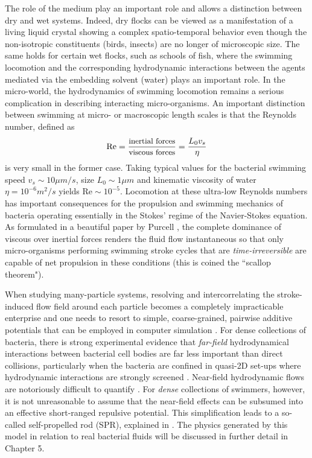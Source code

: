 \documentclass[amssymb]{revtex4}
\begin{document}
  
The role of the medium play an important role and allows a distinction between dry and wet systems.   Indeed, dry flocks can be viewed as a manifestation of a living liquid crystal showing a complex spatio-temporal behavior \cite{1995tonertu_prl} even though the non-isotropic constituents  (birds, insects) are no longer of microscopic size. The same holds for certain wet flocks, such as schools of fish, where the swimming locomotion and the corresponding hydrodynamic interactions between the agents mediated via the embedding solvent (water) plays an important role. In the micro-world, the hydrodynamics of swimming locomotion remains a serious complication in describing interacting micro-organisms. An important distinction between swimming at micro- or macroscopic length scales is that the Reynolds number, defined as 
\begin{equation}
\text {Re} =  \frac{\mbox{{\small inertial forces}}}{\mbox{{\small viscous forces}}} = \frac{L_{0} v_{s}}{\eta}
\end{equation}
is very small in the former case. Taking typical values for the bacterial swimming speed $v_{s} \sim 10 \mu m /s$,  size $L_{0} \sim 1 \mu m $ and kinematic viscosity of water $\eta = 10^{-6} m^{2}/s$ yields $\text{Re} \sim 10^{-5}$.  Locomotion at these ultra-low Reynolds numbers has important consequences for the propulsion and swimming mechanics of bacteria operating essentially in the Stokes'  regime of the Navier-Stokes equation.  As formulated in a beautiful paper by Purcell \cite{1977pu}, the complete dominance of viscous over inertial forces renders the fluid flow instantaneous so that only micro-organisms performing swimming stroke cycles that are {\em time-irreversible} are capable of net propulsion in these conditions (this is coined the ``scallop theorem").

When studying many-particle systems, resolving and intercorrelating the stroke-induced flow field around each particle becomes  a completely impracticable enterprise and one needs to resort to simple, coarse-grained,  pairwise additive potentials that can be employed in computer simulation \cite{putz2010}.
For dense collections of bacteria, there is strong experimental evidence that {\em far-field} hydrodynamical interactions between bacterial cell bodies are far less important than direct collisions, particularly when the bacteria are confined in quasi-2D set-ups where hydrodynamic interactions are strongly screened \cite{2011drescheretal}. Near-field hydrodynamic flows are notoriously difficult to quantify \cite{laugapowers}.  For {\em dense} collections of swimmers, however, it is not unreasonable to assume that  the near-field effects can be subsumed into an effective short-ranged repulsive potential.   This simplification leads to a so-called self-propelled rod (SPR), explained in . The physics generated by this model in relation to real bacterial fluids will be discussed in  further detail in Chapter 5.
\end{document}
